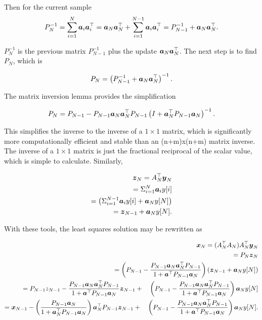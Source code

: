 Then for the current sample
\begin{align}
    P_N^{-1} = \sum_{i=1}^{N} \boldsymbol{a}_i \boldsymbol{a}_i^\top = 
    \boldsymbol{a}_N \boldsymbol{a}_N^\top +\sum_{i=1}^{N-1} \boldsymbol{a}_i \boldsymbol{a}_i^\top
    = P_{N-1}^{-1} + \boldsymbol{a}_N \boldsymbol{a}_N^\top.
\end{align}

$P_N^{-1}$ is the previous matrix $P_{N-1}^{-1}$ plus the update $\boldsymbol{a}_N \boldsymbol{a}_N^\top$. 
The next step is to find $P_N$, which is

\begin{align*}
    P_N = \left( P_{N-1}^{-1} + \boldsymbol{a}_N \boldsymbol{a}_N^\top\right)^{-1}.
\end{align*}

The matrix inversion lemma provides the simplification

\begin{align}
    P_N = P_{N-1} - P_{N-1} \boldsymbol{a}_N \boldsymbol{a}_N^\top P_{N-1} \left(I + \boldsymbol{a}_N^\top P_{N-1} \boldsymbol{a}_N\right)^{-1}.
\end{align}

This simplifies the inverse to the inverse of a $1\times1$ matrix, which is significantly more computationally efficient and stable than an (n+m)x(n+m) matrix inverse.
The inverse of a $1 \times 1$ matrix is just the fractional reciprocal of the scalar value, which is simple to calculate.
Similarly,

\begin{align}
  \boldsymbol{z}_N = A_N^{\top} \boldsymbol{y}_N\\
  =\Sigma_{i=1}^N \boldsymbol{a}_i y[i]\\
  =\left(\Sigma_{i=1}^{N-1} \boldsymbol{a}_i y[i] + \boldsymbol{a}_N y[N] \right)\\
= \boldsymbol{z}_{N-1} + \boldsymbol{a}_N y[N].
\end{align}

With these tools, the least squares solution may be rewritten as

\begin{align*}
    \boldsymbol{x}_N = (A_N^\top A_N) A_N^{\top} \boldsymbol{y}_N\\
    = P_N \boldsymbol{z}_N\\
    = \left(P_{N-1} - \frac{P_{N-1}\boldsymbol{a}_N \boldsymbol{a}_N^\top P_{N-1}}{1 + \boldsymbol{a}^{\top}P_{N-1} \boldsymbol{a}_N} \right) \left(\boldsymbol{z}_{N-1} + \boldsymbol{a}_N y[N]\right)\\
    = P_{N-1}z_{N-1} - \frac{P_{N-1}\boldsymbol{a}_N \boldsymbol{a}_N^\top P_{N-1}}{1 + \boldsymbol{a}^{\top}P_{N-1} \boldsymbol{a}_N} \boldsymbol{z}_{N-1} +
        \quad \left(P_{N-1} - \frac{P_{N-1}\boldsymbol{a}_N \boldsymbol{a}_N^\top P_{N-1}}{1 + \boldsymbol{a}^{\top}P_{N-1} \boldsymbol{a}_N}\right) \boldsymbol{a}_N y[N]\\
    = \boldsymbol{x}_{N-1} - \left(\frac{P_{N-1} \boldsymbol{a}_N}{1 + \boldsymbol{a}_N^\top P_{N-1} \boldsymbol{a}_N}\right) \boldsymbol{a}_N^\top P_{N-1} \boldsymbol{z}_{N-1} +
        \quad \left(P_{N-1} - \frac{P_{N-1}\boldsymbol{a}_N \boldsymbol{a}_N^\top P_{N-1}}{1 + \boldsymbol{a}^{\top}P_{N-1} \boldsymbol{a}_N}\right) \boldsymbol{a}_N y[N].
\end{align*}

